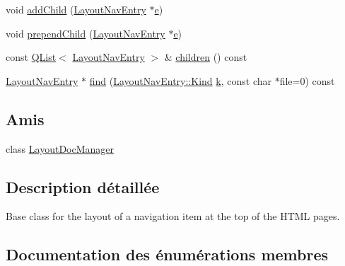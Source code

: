 \begin{DoxyCompactItemize}
void \hyperlink{struct_layout_nav_entry_a17dc5d09c4df07c0d49275ed2d95e789}{add\+Child} (\hyperlink{struct_layout_nav_entry}{Layout\+Nav\+Entry} $\ast$\hyperlink{060__command__switch_8tcl_aff65a51a703804e0ad1adbcfd76c86f8}{e})
\item 
void \hyperlink{struct_layout_nav_entry_a39a0c214375c9766d91d79ef80365ab6}{prepend\+Child} (\hyperlink{struct_layout_nav_entry}{Layout\+Nav\+Entry} $\ast$\hyperlink{060__command__switch_8tcl_aff65a51a703804e0ad1adbcfd76c86f8}{e})
\item 
const \hyperlink{class_q_list}{Q\+List}$<$ \hyperlink{struct_layout_nav_entry}{Layout\+Nav\+Entry} $>$ \& \hyperlink{struct_layout_nav_entry_a7f4f991928a3c8c3e73f6d2551086dd8}{children} () const 
\item 
\hyperlink{struct_layout_nav_entry}{Layout\+Nav\+Entry} $\ast$ \hyperlink{struct_layout_nav_entry_a25289c43e5190b591b02db2f86558ba7}{find} (\hyperlink{struct_layout_nav_entry_aef36305dd829f7cde87ca203ae647c7c}{Layout\+Nav\+Entry\+::\+Kind} \hyperlink{060__command__switch_8tcl_a20363f854eb4098a446733d63d34dbc1}{k}, const char $\ast$file=0) const 
\end{DoxyCompactItemize}
\subsection*{Amis}
\begin{DoxyCompactItemize}
\item 
class \hyperlink{struct_layout_nav_entry_af6431c54f9737e0168be5926d2d9b5e9}{Layout\+Doc\+Manager}
\end{DoxyCompactItemize}


\subsection{Description détaillée}
Base class for the layout of a navigation item at the top of the H\+T\+M\+L pages. 

\subsection{Documentation des énumérations membres}
\hypertarget{struct_layout_nav_entry_aef36305dd829f7cde87ca203ae647c7c}{}
